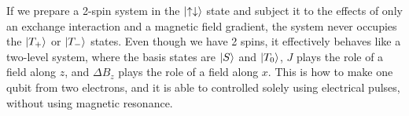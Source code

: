 \documentclass{article}
\begin{document}
If we prepare a 2-spin system in the $\ket{ \uparrow \downarrow}$ state and subject it to the effects of only an exchange interaction and a magnetic field gradient, the system never occupies the $\ket{T_+}$ or $\ket{T_-}$ states. Even though we have 2 spins, it effectively behaves like a two-level system, where the basis states are $\ket{S}$ and $\ket{T_0}$, $J$ plays the role of a field along $z$, and $\Delta B_z$ plays the role of a field along $x$. This is how to make one qubit from two electrons, and it is able to controlled solely using electrical pulses, without using magnetic resonance.
\end{document}
